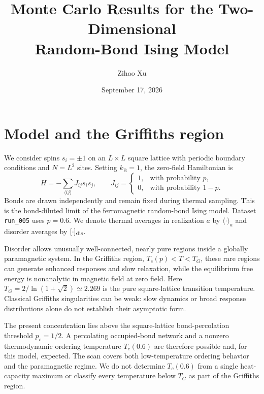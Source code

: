 \documentclass[a4paper,11pt]{article}
\title{Monte Carlo Results for the Two-Dimensional\\Random-Bond Ising Model}
\author{Zihao Xu}
\date{September 17, 2026}
\begin{document}
\maketitle
\vspace{-2em}
\section{Model and the Griffiths region}
We consider spins $s_i=\pm1$ on an $L\times L$ square lattice with periodic boundary conditions and
$N=L^2$ sites. Setting $k_{\mathrm B}=1$, the zero-field Hamiltonian is
\begin{equation}
H=-\sum_{\langle ij\rangle}J_{ij}s_i s_j,\qquad J_{ij}=\begin{cases}1,&\text{with probability }p,\\0,&\text{with probability }1-p.\end{cases}
\end{equation}
Bonds are drawn independently and remain fixed during thermal sampling. This is the bond-diluted
limit of the ferromagnetic random-bond Ising model. Dataset \texttt{run\_005} uses $p=0.6$. We
denote thermal averages in realization $a$ by $\langle\cdot\rangle_a$ and disorder averages by
$[\cdot]_{\rm dis}$.

Disorder allows unusually well-connected, nearly pure regions inside a globally paramagnetic system.
In the Griffiths region, $T_c(p)<T<T_G$, these rare regions can generate enhanced responses and slow
relaxation, while the equilibrium free energy is nonanalytic in magnetic field at zero field. Here
$T_G=2/\ln(1+\sqrt2)\simeq2.269$ is the pure square-lattice transition temperature. Classical
Griffiths singularities can be weak: slow dynamics or broad response distributions alone do not
establish their asymptotic form.

The present concentration lies above the square-lattice bond-percolation threshold $p_c=1/2$.
A percolating occupied-bond network and a nonzero thermodynamic ordering temperature $T_c(0.6)$
are therefore possible and, for this model, expected. The scan covers both low-temperature ordering
behavior and the paramagnetic regime. We do not determine $T_c(0.6)$ from a single heat-capacity
maximum or classify every temperature below $T_G$ as part of the Griffiths region.
\end{document}

